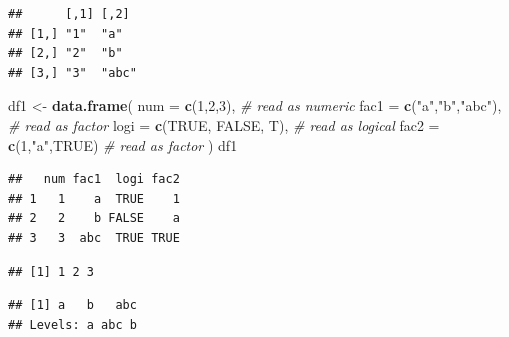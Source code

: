 \documentclass[]{book}
\newenvironment{Shaded}{\begin{snugshade}}{\end{snugshade}}
\newcommand{\KeywordTok}[1]{\textcolor[rgb]{0.13,0.29,0.53}{\textbf{{#1}}}}
\newcommand{\DataTypeTok}[1]{\textcolor[rgb]{0.13,0.29,0.53}{{#1}}}
\newcommand{\DecValTok}[1]{\textcolor[rgb]{0.00,0.00,0.81}{{#1}}}
\newcommand{\StringTok}[1]{\textcolor[rgb]{0.31,0.60,0.02}{{#1}}}
\newcommand{\CommentTok}[1]{\textcolor[rgb]{0.56,0.35,0.01}{\textit{{#1}}}}
\newcommand{\OtherTok}[1]{\textcolor[rgb]{0.56,0.35,0.01}{{#1}}}
\newcommand{\NormalTok}[1]{{#1}}
\theoremstyle{definition}
\theoremstyle{definition}
\theoremstyle{remark}
\begin{document}
\begin{verbatim}
##      [,1] [,2] 
## [1,] "1"  "a"  
## [2,] "2"  "b"  
## [3,] "3"  "abc"
\end{verbatim}

\begin{Shaded}
\begin{Highlighting}[]
\NormalTok{df1 <-}\StringTok{ }\KeywordTok{data.frame}\NormalTok{(}
        \DataTypeTok{num  =} \KeywordTok{c}\NormalTok{(}\DecValTok{1}\NormalTok{,}\DecValTok{2}\NormalTok{,}\DecValTok{3}\NormalTok{),           }\CommentTok{# read as numeric}
        \DataTypeTok{fac1 =} \KeywordTok{c}\NormalTok{(}\StringTok{"a"}\NormalTok{,}\StringTok{"b"}\NormalTok{,}\StringTok{"abc"}\NormalTok{),   }\CommentTok{# read as factor}
        \DataTypeTok{logi =} \KeywordTok{c}\NormalTok{(}\OtherTok{TRUE}\NormalTok{, }\OtherTok{FALSE}\NormalTok{, T),  }\CommentTok{# read as logical}
        \DataTypeTok{fac2  =} \KeywordTok{c}\NormalTok{(}\DecValTok{1}\NormalTok{,}\StringTok{"a"}\NormalTok{,}\OtherTok{TRUE}\NormalTok{)      }\CommentTok{# read as factor}
       \NormalTok{)  }
\NormalTok{df1}
\end{Highlighting}
\end{Shaded}

\begin{verbatim}
##   num fac1  logi fac2
## 1   1    a  TRUE    1
## 2   2    b FALSE    a
## 3   3  abc  TRUE TRUE
\end{verbatim}

\begin{Shaded}
\end{Shaded}

\begin{verbatim}
## [1] 1 2 3
\end{verbatim}

\begin{Shaded}
\end{Shaded}

\begin{verbatim}
## [1] a   b   abc
## Levels: a abc b
\end{verbatim}

\begin{Shaded}
\end{Shaded}
\end{document}
